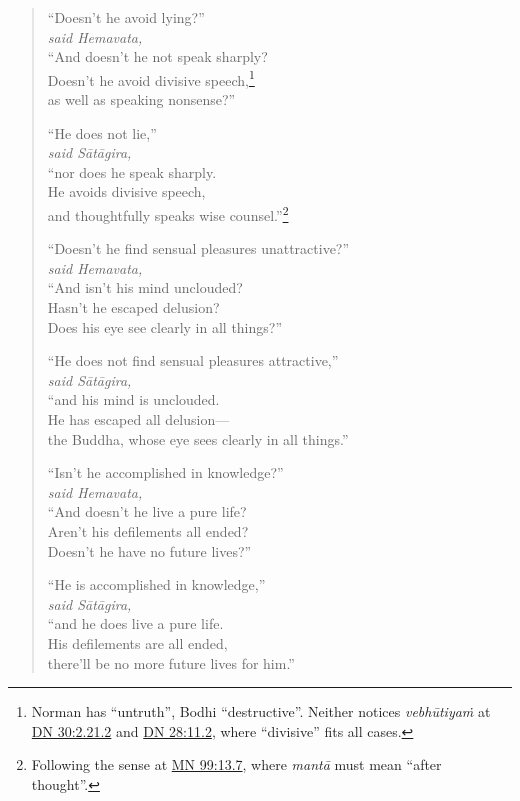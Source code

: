 \documentclass[12pt,openany]{book}%
\newcommand*{\scspeaker}[1]{\hspace{2em}\textit{#1}}
\begin{document}
\begin{verse}
“Doesn’t he avoid lying?” \\
\scspeaker{said Hemavata, }\\
“And doesn’t he not speak sharply? \\
Doesn’t he avoid divisive speech,\footnote{Norman has “untruth”, Bodhi “destructive”. Neither notices \textit{\textsanskrit{vebhūtiyaṁ}} at  \href{https://suttacentral.net/dn30/en/sujato\#2.21.2}{DN 30:2.21.2} and \href{https://suttacentral.net/dn28/en/sujato\#11.2}{DN 28:11.2}, where “divisive” fits all cases. } \\
as well as speaking nonsense?” 

“He does not lie,” \\
\scspeaker{said \textsanskrit{Sātāgira}, }\\
“nor does he speak sharply. \\
He avoids divisive speech, \\
and thoughtfully speaks wise counsel.”\footnote{Following the sense at \href{https://suttacentral.net/mn99/en/sujato\#13.7}{MN 99:13.7}, where \textit{\textsanskrit{mantā}} must mean “after thought”. } 

“Doesn’t he find sensual pleasures unattractive?” \\
\scspeaker{said Hemavata, }\\
“And isn’t his mind unclouded? \\
Hasn’t he escaped delusion? \\
Does his eye see clearly in all things?” 

“He does not find sensual pleasures attractive,” \\
\scspeaker{said \textsanskrit{Sātāgira}, }\\
“and his mind is unclouded. \\
He has escaped all delusion—\\
the Buddha, whose eye sees clearly in all things.” 

“Isn’t he accomplished in knowledge?” \\
\scspeaker{said Hemavata, }\\
“And doesn’t he live a pure life? \\
Aren’t his defilements all ended? \\
Doesn’t he have no future lives?” 

“He is accomplished in knowledge,” \\
\scspeaker{said \textsanskrit{Sātāgira}, }\\
“and he does live a pure life. \\
His defilements are all ended, \\
there’ll be no more future lives for him.” 


\end{verse}
\end{document}
